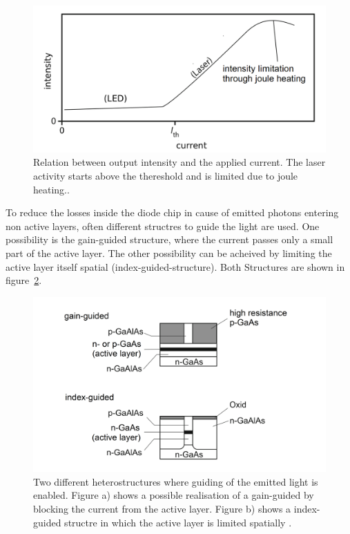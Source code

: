 \begin{figure}
  \centering
  \includegraphics[width = \textwidth]{Pics/current.png}
  \caption{Relation between output intensity and the applied current. The laser
  activity starts above the thereshold and is limited due to joule heating.\cite{eichler}.}
  \label{fig:current}
\end{figure}
To reduce the losses inside the diode chip in cause of emitted photons entering
non active layers, often different structres to guide the light are used.
One possibility is the gain-guided structure, where the current passes only a
small part of the active layer. The other possibility can be acheived by limiting
the active layer itself spatial (index-guided-structure). Both Structures are
shown in figure~\ref{fig:guided}.
\begin{figure}
  \centering
  \includegraphics[width = \textwidth]{Pics/guided.png}
  \caption{Two different heterostructures where guiding of the emitted light is
  enabled. Figure a) shows a possible realisation of a gain-guided by blocking
  the current from the active layer. Figure b) shows a index-guided structre in
  which the active layer is limited spatially \cite{Eichler}. }
  \label{fig:guided}
\end{figure}
